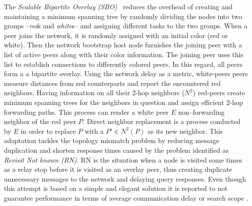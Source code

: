 
The \emph{Scalable Bipartite Overlay (SBO)}~\cite{LXN2004,LXN2007} 
reduces the overhead of creating
and maintaining a minimum spanning tree 
by randomly dividing the nodes into
two groups --\emph{red}s and \emph{white}s-- 
and assigning different tasks to the two groups.
When a peer joins the network, it is randomly assigned with an initial
color (red or white).
Then the network bootstrap host node furnishes the joining peer with a list
of active peers along with their color information. 
The joining peer uses this list to 
establish connections to differently colored peers. 
In this regard, all peers form a a bipartite overlay. 
Using the network delay as a metric, white-peers 
peers measure distances from red counterparts
and report the encountered red neighbors.
Having information on all their $2$-hop neighbors 
($N^2$)
red-peers create minimum spanning trees for the neighbors in question and
assign efficient $2$-hop forwarding paths. This process can render a white
peer $E$ non--forwarding neighbor of the red peer $P$. Direct neighbor
replacement is a process conducted by $E$ in order to replace $P$ with a
$P' \in N^2(P)$ as its new neighbor. This adaptation tackles the
topology mismatch problem by reducing message duplication and shorten response
times caused by the problem identified as \emph{Revisit Not known (RN)}. RN is
the situation when a node is visited some times as a relay stop before it is
visited as an overlay peer, thus creating duplicate unnecessary messages to the
network and delaying query responses.
Even though this attempt is based on a simple and elegant solution it is
reported to not guarantee performance in terms of average communication delay
or search scope \cite{HLH2009}.
%
%
